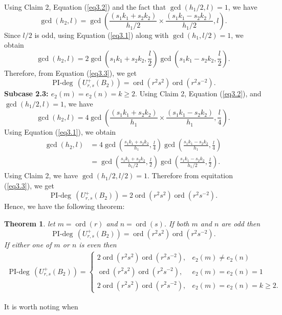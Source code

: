 \documentclass[12 pt,reqno]{amsart}
\numberwithin{equation}{section}
\DeclareMathOperator{\ord}{ord}
\DeclareMathOperator{\pideg}{PI-deg}
\newtheorem{theorem}[thm]{Theorem}
\theoremstyle{definition}
\theoremstyle{definition}
\theoremstyle{remark}
\theoremstyle{remark}
\begin{document}
\noindent Using  Claim 2, Equation (\ref{eq3.2}) and the fact that $\gcd(h_1/2,l)=1$, we have $$\gcd(h_2,l)=\gcd\left( \frac{(s_1k_1 + s_2k_2)}{h_1/2} \times \frac{(s_1k_1 - s_2k_2)}{h_1/2}, l\right).$$
Since $l/2$ is odd, using Equation (\ref{eq3.1}) along with $\gcd(h_1,l/2)=1$, we obtain
$$\gcd(h_2,l)= 2\gcd\left(s_1k_1 + s_2k_2,\frac{l}{2} \right)\gcd\left(s_1k_1 - s_2k_2,\frac{l}{2} \right).$$
Therefore, from Equation (\ref{eq3.3}), we get
$$\operatorname{PI-deg}\, \left(U_{r,s}^+(B_2)\right)= \ord(r^2s^2)  \ord(r^2s^{-2}).$$
\noindent\textbf{Subcase 2.3: $e_2(m)= e_2(n)=k\geq 2$}.
\noindent Using  Claim 2, Equation (\ref{eq3.2}), and $\gcd(h_1/2,l)=1$, we have $$\gcd(h_2,l)=4\gcd\left( \frac{(s_1k_1 + s_2k_2)}{h_1} \times \frac{(s_1k_1 - s_2k_2)}{h_1}, \frac{l}{4}\right).$$
Using Equation (\ref{eq3.1}), we obtain
\begin{align*}
  \gcd(h_2,l)&= 4\gcd\left(\frac{s_1k_1 + s_2k_2}{h_1},\frac{l}{4} \right)\gcd\left(\frac{s_1k_1 - s_2k_2}{h_1},\frac{l}{4} \right)\\
  &=\gcd\left(\frac{s_1k_1 + s_2k_2}{h_1/2},\frac{l}{2} \right)\gcd\left(\frac{s_1k_1 - s_2k_2}{h_1/2},\frac{l}{2} \right).
\end{align*}
Using Claim 2, we have $\gcd(h_1/2,l/2)=1$. Therefore from equitation (\ref{eq3.3}), we get
$$\operatorname{PI-deg}\, \left(U_{r,s}^+(B_2)\right)= 2\ord(r^2s^2)  \ord(r^2s^{-2}).$$
Hence, we have the following theorem:
\begin{theorem} \label{m2}
let $m=\ord(r)$ and $n=\ord(s)$. If both $m$ and $n$ are odd then
    \[\pideg \,\left(U_{r,s}^+(B_2)\right)=\ord(r^2s^2)\ord(r^2s^{-2}).\] If either one of $m$ or $n$ is even then 
    \begin{align*}
        \pideg \,\left(U_{r,s}^+(B_2)\right)=\begin{cases}
           2\ord(r^2s^2)\ord(r^2s^{-2}), & e_2(m)\neq e_2(n)\\
            \ord(r^2s^2)\ord(r^2s^{-2}), &e_2(m)=e_2(n)=1\\
             2\ord(r^2s^2)\ord(r^2s^{-2}), &e_2(m)=e_2(n)=k \geq 2.
        \end{cases}
    \end{align*}
    \end{theorem}
    It is worth noting when
\end{document}
